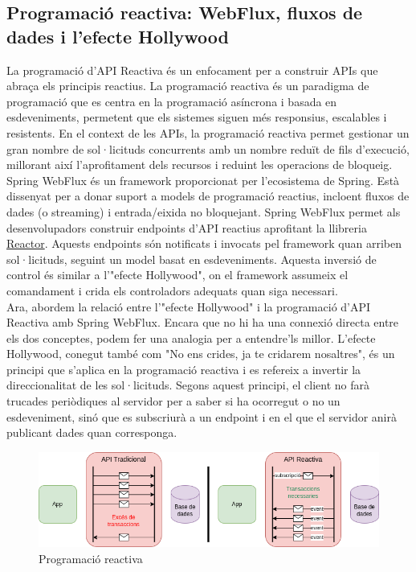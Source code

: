 \subsection{Programació reactiva: WebFlux, fluxos de dades i l'efecte Hollywood}
La programació d'API Reactiva és un enfocament per a construir APIs que abraça els principis reactius. La programació reactiva és un paradigma de programació que es centra en la programació asíncrona i basada en esdeveniments, permetent que els sistemes siguen més responsius, escalables i resistents. En el context de les APIs, la programació reactiva permet gestionar un gran nombre de sol·licituds concurrents amb un nombre reduït de fils d'execució, millorant així l'aprofitament dels recursos i reduint les operacions de bloqueig.
\\[3mm]
Spring WebFlux és un framework proporcionat per l'ecosistema de Spring. Està dissenyat per a donar suport a models de programació reactius, incloent fluxos de dades (o streaming) i entrada/eixida no bloquejant. Spring WebFlux permet als desenvolupadors construir endpoints d'API reactius aprofitant la llibreria \href{https://projectreactor.io/}{Reactor}. Aquests endpoints són notificats i invocats pel framework quan arriben sol·licituds, seguint un model basat en esdeveniments. Aquesta inversió de control és similar a l'"efecte Hollywood", on el framework assumeix el comandament i crida els controladors adequats quan siga necessari.
\\[3mm]
Ara, abordem la relació entre l'"efecte Hollywood" i la programació d'API Reactiva amb Spring WebFlux. Encara que no hi ha una connexió directa entre els dos conceptes, podem fer una analogia per a entendre'ls millor. L'efecte Hollywood, conegut també com "No ens crides, ja te cridarem nosaltres", és un principi que s'aplica en la programació reactiva i es refereix a invertir la direccionalitat de les sol·licituds. Segons aquest principi, el client no farà trucades periòdiques al servidor per a saber si ha ocorregut o no un esdeveniment, sinó que es subscriurà a un endpoint i en el que el servidor anirà publicant dades quan corresponga.
\begin{figure}[H]
    \centering
    \includegraphics[width=\textwidth]{images/reactiva.png}
    \caption{Programació reactiva}
    \label{fig:Programació reactiva}
\end{figure}
